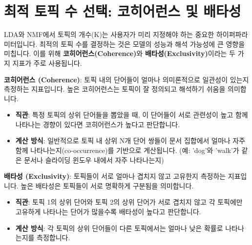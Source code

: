 \documentclass[11pt,a4paper]{article}
\theoremstyle{definition}
\begin{document}
\newpage
\section*{최적 토픽 수 선택: 코히어런스 및 배타성}
LDA와 NMF에서 토픽의 개수(K)는 사용자가 미리 지정해야 하는 중요한 하이퍼파라미터입니다. 최적의 토픽 수를 결정하는 것은 모델의 성능과 해석 가능성에 큰 영향을 미칩니다. 이를 위해 \textbf{코히어런스(Coherence)}와 \textbf{배타성(Exclusivity)}이라는 두 가지 지표가 주로 사용됩니다.

\begin{infobox} %
\textbf{코히어런스 (Coherence)}:
토픽 내의 단어들이 얼마나 의미론적으로 일관성이 있는지 측정하는 지표입니다.
높은 코히어런스는 토픽이 잘 정의되고 해석하기 쉬움을 의미합니다.
\end{infobox}

\begin{itemize}
    \item \textbf{직관}: 특정 토픽의 상위 단어들을 뽑았을 때, 이 단어들이 서로 관련성이 높고 함께 나타나는 경향이 있다면 코히어런스가 높다고 판단합니다.
    \item \textbf{계산 방식}: 일반적으로 토픽 내 상위 N개 단어 쌍들이 문서 집합에서 얼마나 자주 함께 나타나는지(co-occurrence)를 기반으로 계산됩니다. (예: 'dog'와 'walk'가 같은 문서나 슬라이딩 윈도우 내에서 자주 나타나는지)
\end{itemize}

\begin{infobox} %
\textbf{배타성 (Exclusivity)}:
토픽들이 서로 얼마나 겹치지 않고 고유한지 측정하는 지표입니다.
높은 배타성은 토픽들이 서로 명확하게 구분됨을 의미합니다.
\end{infobox}

\begin{itemize}
    \item \textbf{직관}: 토픽 1의 상위 단어와 토픽 2의 상위 단어가 서로 겹치지 않고 각 토픽에만 고유하게 나타나는 단어가 많을수록 배타성이 높다고 판단합니다.
    \item \textbf{계산 방식}: 각 토픽의 상위 단어들이 다른 토픽에서는 얼마나 낮은 확률로 나타나는지를 측정합니다.
\end{itemize}
\end{document}
